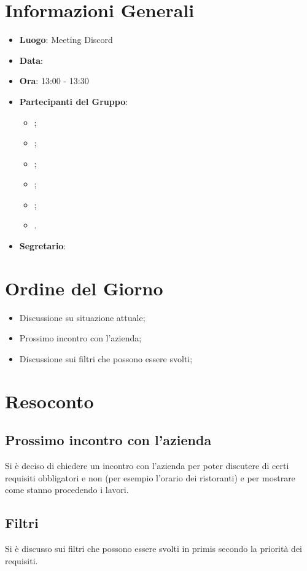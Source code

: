 \section{Informazioni Generali}

\begin{itemize}
	\item{\textbf{Luogo}}: Meeting Discord
	\item{\textbf{Data}}: \D
	\item{\textbf{Ora}}: 13:00 - 13:30
	\item{\textbf{Partecipanti del Gruppo}}:
	\begin{itemize}
		\item{\EP{};}
		\item{\FP{};}
		\item{\GC{};}
		\item{\LW{};}
		\item{\MG{};}
		\item{\PV{}.}
	\end{itemize}
	\item{\textbf{Segretario}}: \PV{}
\end{itemize}

\section{Ordine del Giorno}
\begin{itemize}
	\item{Discussione su situazione attuale;}
	\item{Prossimo incontro con l'azienda;}
	\item{Discussione sui filtri che possono essere svolti;}
\end{itemize}

\section{Resoconto}

\subsection{Prossimo incontro con l'azienda}
Si è deciso di chiedere un incontro con l'azienda per poter discutere di certi requisiti obbligatori e non (per esempio l'orario dei ristoranti) e per mostrare come stanno procedendo i lavori.


\subsection{Filtri}
Si è discusso sui filtri che possono essere svolti in primis secondo la priorità dei requisiti.
